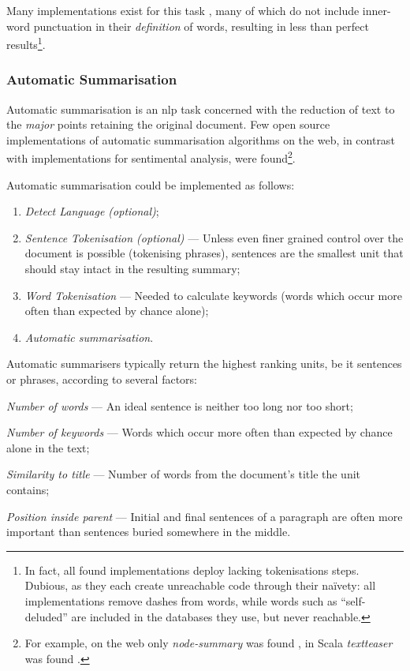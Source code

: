 Many implementations exist for this task
  \autocites{thinkroth/sentimental-source-code}{mileszim/sediment-source-code}
  {thisandagain/sentiment-source-code}, many of which do not include
  inner-word punctuation in their \emph{definition} of words, resulting in
  less than perfect results\footnote{In fact, all found implementations
      deploy lacking tokenisations steps.
    Dubious, as they each create unreachable code through their na\"ivety:
      all implementations remove dashes from words, while words such as
      ``self-deluded'' are included in the databases they use, but never
      reachable.}.

\subsubsection{Automatic Summarisation}\label{automatic-summarisation}

Automatic summarisation is an \gls{nlp} task concerned with the reduction
  of text to the \emph{major} points retaining the original document.
Few open source implementations of automatic summarisation algorithms on
  the web, in contrast with implementations for sentimental analysis, were
  found\footnote{For example, on the web only \emph{node-summary} was found
    \autocite{jbrooksuk/node-summary-source-code}, in Scala \emph{textteaser}
    was found \autocite{MojoJolo/textteaser-source-code}.}.

Automatic summarisation could be implemented as follows:

\begin{enumerate}
\item\emph{Detect Language (optional)};
\item\emph{Sentence Tokenisation (optional)} --- Unless even finer grained
  control over the document is possible (tokenising phrases), sentences are
  the smallest unit that should stay intact in the resulting summary;
\item\emph{Word Tokenisation} --- Needed to calculate keywords (words
  which occur more often than expected by chance alone);
\item\emph{Automatic summarisation}.
\end{enumerate}

\noindent Automatic summarisers typically return the highest ranking units,
  be it sentences or phrases, according to several factors:

\begin{aenumerate}
\item\emph{Number of words} --- An ideal sentence is neither too long nor
  too short;
\item\emph{Number of keywords} --- Words which occur more often than
  expected by chance alone in the text;
\item\emph{Similarity to title} --- Number of words from the document's
  title the unit contains;
\item\emph{Position inside parent} --- Initial and final sentences of a
  paragraph are often more important than sentences buried somewhere in
  the middle.
\end{aenumerate}

